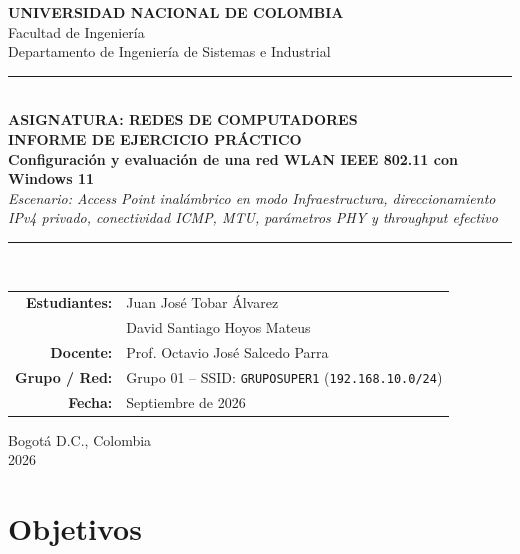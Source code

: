 \documentclass[11pt, a4paper]{article}
\begin{document}
\begin{titlepage}
    \centering
    \vspace*{0.8cm}
    {\Large \textbf{UNIVERSIDAD NACIONAL DE COLOMBIA}}\\[0.25cm]
    {\large Facultad de Ingeniería}\\
    {\large Departamento de Ingeniería de Sistemas e Industrial}\\[1.2cm]

    \textcolor{unalgreen}{\rule{\textwidth}{1.5pt}}\\[0.5cm]
    {\small \textbf{ASIGNATURA: REDES DE COMPUTADORES}}\\[0.4cm]
    {\LARGE \textbf{INFORME DE EJERCICIO PRÁCTICO}}\\[0.35cm]
    {\Large \textbf{Configuración y evaluación de una red WLAN IEEE 802.11 con Windows 11}}\\[0.3cm]
    {\normalsize \textit{Escenario: Access Point inalámbrico en modo Infraestructura, direccionamiento IPv4 privado, conectividad ICMP, MTU, parámetros PHY y throughput efectivo}}\\[0.5cm]
    \textcolor{unalgreen}{\rule{\textwidth}{1.5pt}}\\[1.6cm]

    \begin{tabular}{rl}
        \textbf{Estudiantes:} & Juan José Tobar Álvarez \\
                              & David Santiago Hoyos Mateus \\[0.5cm]
        \textbf{Docente:}     & Prof. Octavio José Salcedo Parra \\[0.5cm]
        \textbf{Grupo / Red:} & Grupo 01 -- SSID: \texttt{GRUPOSUPER1} (\texttt{192.168.10.0/24}) \\[0.5cm]
        \textbf{Fecha:}       & Septiembre de 2026 \\
    \end{tabular}

    \vfill
    {\normalsize Bogotá D.C., Colombia}\\
    {\normalsize 2026}
\end{titlepage}

\section{Objetivos}
\end{document}
